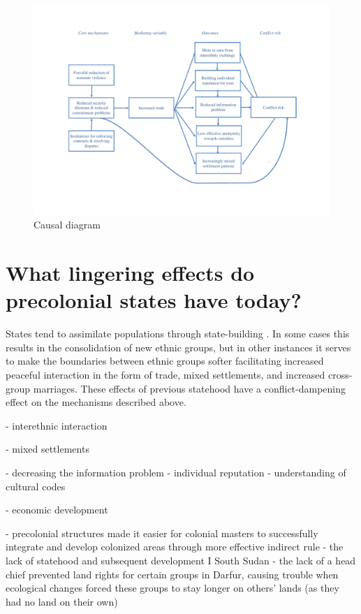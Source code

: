 \documentclass[12pt]{article}
\begin{document}

\begin{figure}[htpb]
	\centering
	\includegraphics[width=0.8\linewidth]{img/Causal diagram.pdf}
	\caption{Causal diagram}
	\label{causal}
\end{figure}

\section{What lingering effects do precolonial states have today?}

States tend to assimilate populations through state-building \citep{Anderson2006}.
In some cases this results in the consolidation of new ethnic groups, but in
other instances it serves to make the boundaries between ethnic groups softer
facilitating increased peaceful interaction in the form of trade, mixed
settlements, and increased cross-group marriages. These effects of previous
statehood have a conflict-dampening effect on the mechanisms described above.

- interethnic interaction

- mixed settlements

- decreasing the information problem
	- individual reputation
	- understanding of cultural codes

- economic development

- precolonial structures made it easier for colonial masters to successfully
integrate and develop colonized areas through more effective indirect rule
	- the lack of statehood and subsequent development I South Sudan
	- the lack of a head chief prevented land rights for certain groups in
	Darfur, causing trouble when ecological changes forced these groups to
	stay longer on others’ lands (as they had no land on their own)
\end{document}
